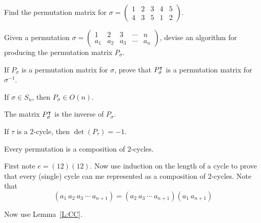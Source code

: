 \documentclass{ximera}
\begin{document}
\begin{exercise}
  Find the permutation matrix for $\sigma = \left(\begin{smallmatrix}
    1 & 2 & 3 & 4 & 5\\
    4 & 3 & 5 & 1 & 2
  \end{smallmatrix}\right)$.
\end{exercise}


\begin{exercise}
  Given a permutation $\sigma = \left(\begin{smallmatrix}
    1 & 2 & 3 & \cdots & n\\
    a_1 & a_2 & a_3 & \cdots & a_n
  \end{smallmatrix}\right)$, devise an algorithm for producing the permutation matrix $P_{\sigma}$.
\end{exercise}

\begin{exercise}
  If $P_\sigma$ is a permutation matrix for $\sigma$, prove that
  $P_\sigma^\intercal$ is a permutation matrix for $\sigma^{-1}$.
\end{exercise}



\begin{lemma}
  If $\sigma \in S_n$, then $P_\sigma \in O(n)$.
  \begin{sketch}
    The matrix $P_\sigma^\intercal$ is the inverse of $P_\sigma$.
  \end{sketch}
\end{lemma}

\begin{corollary}
  If $\tau$ is a $2$-cycle, then $\det(P_\tau) = -1$.
\end{corollary}





\begin{lemma}
  Every permutation is a composition of $2$-cycles.
  \begin{sketch}
    First note $e = (12)(12)$. Now use induction on the length of a
    cycle to prove that every (single) cycle can me represented as a
    composition of $2$-cycles. Note that
    \[
    (a_1 \ a_2 \ a_3 \ \cdots \ a_{n+1}) = (a_2 \ a_3 \ \cdots \ a_{n+1}) (a_1 \ a_{n+1}) 
    \]

    Now use Lemma~\ref{L:CC}.
  \end{sketch}
\end{lemma}
\end{document}
